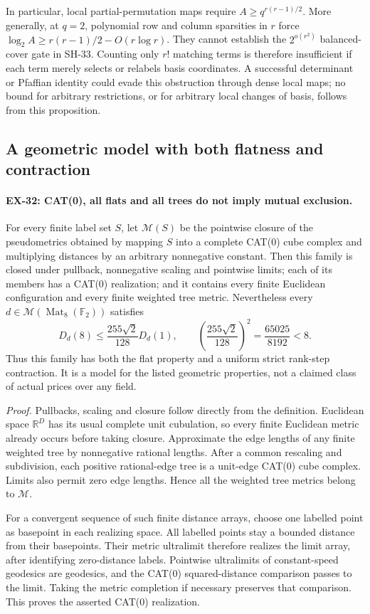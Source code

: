 In particular, local partial-permutation maps require
$A\ge q^{r(r-1)/2}$. More generally, at $q=2$, polynomial
row and column sparsities in $r$ force
$\log_2 A\ge r(r-1)/2-O(r\log r)$.
They cannot establish the $2^{o(r^2)}$ balanced-cover gate in
SH-33. Counting only $r!$ matching terms is therefore
insufficient if each term merely selects or relabels basis
coordinates. A successful determinant or Pfaffian identity
could evade this obstruction through dense local maps; no
bound for arbitrary restrictions, or for arbitrary local
changes of basis, follows from this proposition.

\subsection{A geometric model with both flatness and contraction}

\paragraph{EX-32: CAT(0), all flats and all trees do not imply mutual exclusion.}
For every finite label set $S$, let $\mathcal M(S)$ be the
pointwise closure of the pseudometrics obtained by mapping $S$
into a complete CAT(0) cube complex and multiplying distances
by an arbitrary nonnegative constant. Then this family is
closed under pullback, nonnegative scaling and pointwise limits;
each of its members has a CAT(0) realization; and it contains
every finite Euclidean configuration and every finite weighted
tree metric. Nevertheless every $d\in\mathcal M(
\operatorname{Mat}_8(\mathbb F_2))$ satisfies
\[
 D_d(8)\le\frac{255\sqrt2}{128}D_d(1),
 \qquad
 \left(\frac{255\sqrt2}{128}\right)^2
      =\frac{65025}{8192}<8.
 \tag{EX32.1}
\]
Thus this family has both the flat property and a uniform
strict rank-step contraction. It is a model for the listed
geometric properties, not a claimed class of actual prices
over any field.

\emph{Proof.}
Pullbacks, scaling and closure follow directly from the
definition. Euclidean space $\mathbb R^D$ has its usual
complete unit cubulation, so every finite Euclidean metric
already occurs before taking closure. Approximate the edge
lengths of any finite weighted tree by nonnegative rational
lengths. After a common rescaling and subdivision, each
positive rational-edge tree is a unit-edge CAT(0) cube complex.
Limits also permit zero edge lengths. Hence all the weighted
tree metrics belong to $\mathcal M$.

For a convergent sequence of such finite distance arrays,
choose one labelled point as basepoint in each realizing
space. All labelled points stay a bounded distance from their
basepoints. Their metric ultralimit therefore realizes the
limit array, after identifying zero-distance labels. Pointwise
ultralimits of constant-speed geodesics are geodesics, and
the CAT(0) squared-distance comparison passes to the limit.
Taking the metric completion if necessary preserves that
comparison. This proves the asserted CAT(0) realization.

